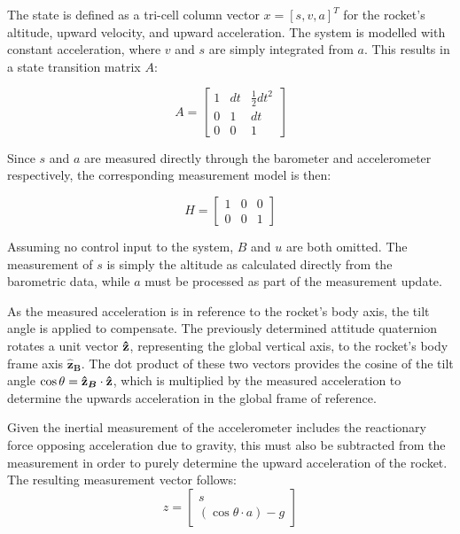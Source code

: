 The state is defined as a tri-cell column vector $x = [s, v, a]^T$ for the rocket's altitude, upward velocity, and upward acceleration. The system is modelled with constant acceleration, where $v$ and $s$ are simply integrated from $a$. This results in a state transition matrix $A$:
\begin{equation}
  A = \begin{bmatrix}
        1& dt& \frac{1}{2}dt^2\\
        0& 1& dt              \\
        0& 0& 1
      \end{bmatrix} 
  \label{eq:kalmanA}
\end{equation}

Since $s$ and $a$ are measured directly through the barometer and accelerometer respectively, the corresponding measurement model is then:

\begin{equation}
  H = \begin{bmatrix}
        1 & 0 & 0\\
        0 & 0 & 1
      \end{bmatrix}
  \label{eq:kalmanH}
\end{equation}

Assuming no control input to the system, $B$ and $u$ are both omitted. The measurement of $s$ is simply the altitude as calculated directly from the barometric data, while $a$ must be processed as part of the measurement update.

As the measured acceleration is in reference to the rocket's body axis, the tilt angle is applied to compensate. The previously determined attitude quaternion rotates a unit vector $\boldsymbol{\hat{\textbf{z}}}$, representing the global vertical axis, to the rocket's body frame axis $\bm{\hat{\textbf{z}}_B}$. The dot product of these two vectors provides the cosine of the tilt angle $\cos{\theta} = \bm{\hat{\textbf{z}}_B}\cdot \boldsymbol{\hat{\textbf{z}}}$, which is multiplied by the measured acceleration to determine the upwards acceleration in the global frame of reference. 

Given the inertial measurement of the accelerometer includes the reactionary force opposing acceleration due to gravity, this must also be subtracted from the measurement in order to purely determine the upward acceleration of the rocket. The resulting measurement vector follows:
\begin{equation}
  z = \begin{bmatrix}
        s\\
        (\cos{\theta}\cdot a)-g
      \end{bmatrix}
  \label{eq:kalmanZ}
\end{equation}

